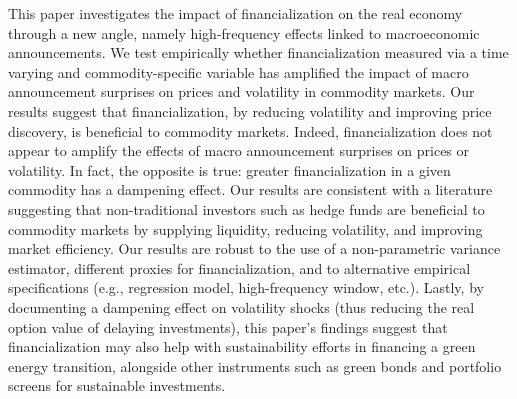 \documentclass[12pt]{article}
\begin{document}
This paper investigates the impact of financialization on the real economy through a new angle, namely high-frequency effects linked to macroeconomic announcements. We test empirically whether financialization measured via a time varying and commodity-specific variable has amplified the impact of macro announcement surprises on prices and volatility in commodity markets. Our results suggest that financialization, by reducing volatility and improving price discovery, is beneficial to commodity markets. Indeed, financialization does not appear to amplify the effects of macro announcement surprises on prices or volatility. In fact, the opposite is true: greater financialization in a given commodity has a dampening effect. Our results are consistent with a literature suggesting that non-traditional investors such as hedge funds are beneficial to commodity markets by supplying liquidity, reducing volatility, and improving market efficiency. Our results are robust to the use of a non-parametric variance estimator, different proxies for financialization, and to alternative empirical specifications (e.g., regression model, high-frequency window, etc.). Lastly, by documenting a dampening effect on volatility shocks (thus reducing the real option value of delaying investments), this paper’s findings suggest that financialization may also help with sustainability efforts in financing a green energy transition, alongside other instruments such as green bonds and portfolio screens for sustainable investments.





\newpage
%




\end{document}
